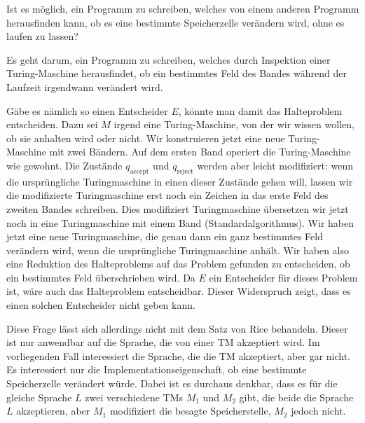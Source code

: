 Ist es möglich, ein Programm zu schreiben, welches von einem anderen
Programm herausfinden kann, ob es eine bestimmte Speicherzelle
verändern wird, ohne es laufen zu lassen?


\begin{loesung}
Es geht darum, ein Programm zu schreiben, welches durch Inspektion
einer Turing-Maschine herausfindet, ob ein bestimmtes Feld des
Bandes während der Laufzeit irgendwann verändert wird.

Gäbe es nämlich so einen Entscheider $E$, könnte man damit das Halteproblem
entscheiden. Dazu sei $M$ irgend eine Turing-Maschine, von der wir
wissen wollen, ob sie anhalten wird oder nicht.
Wir konstruieren jetzt eine neue Turing-Maschine mit zwei
Bändern. Auf dem ersten Band operiert die Turing-Maschine
wie gewohnt.
Die Zustände $q_\text{accept}$ und $q_\text{reject}$ werden
aber leicht modifiziert: wenn die ursprüngliche Turingmaschine 
in einen dieser Zustände gehen will, lassen wir die modifizierte
Turingmaschine erst noch ein Zeichen in das erste Feld des zweiten
Bandes schreiben. Dies modifiziert Turingmaschine übersetzen wir jetzt noch
in eine Turingmaschine mit einem Band (Standardalgorithmus). Wir haben
jetzt eine neue Turingmaschine, die genau dann ein ganz bestimmtes
Feld verändern wird, wenn die ursprüngliche Turingmaschine
anhält. Wir haben also eine Reduktion des Halteproblems auf das
Problem gefunden zu entscheiden, ob ein bestimmtes Feld überschrieben
wird. Da $E$ ein Entscheider für dieses Problem ist, wäre auch das
Halteproblem entscheidbar. Dieser Widerspruch zeigt, dass es einen
solchen Entscheider nicht geben kann.

Diese Frage lässt sich allerdings nicht mit dem Satz von Rice 
behandeln. Dieser ist nur anwendbar auf die Sprache, die von einer
TM akzeptiert wird. Im vorliegenden Fall interessiert die Sprache,
die die TM akzeptiert, aber gar nicht.
Es interessiert nur die Implementationseigenschaft, ob eine
bestimmte Speicherzelle verändert würde.
Dabei ist es durchaus denkbar, dass es für die gleiche Sprache $L$
zwei verschiedene TMs $M_1$ und $M_2$ gibt, die beide die Sprache $L$
akzeptieren, aber $M_1$ modifiziert die besagte Speicherstelle, $M_2$
jedoch nicht.
\end{loesung}
